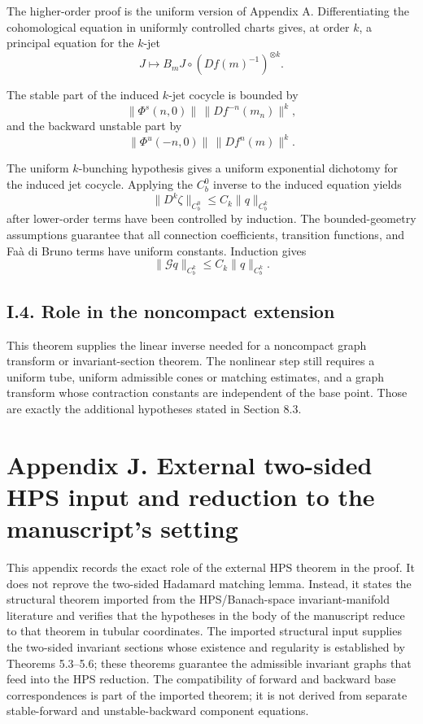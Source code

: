 \documentclass[12pt,a4paper]{article}
\theoremstyle{plain}
\numberwithin{equation}{section}
\numberwithin{theorem}{section}
\begin{document}
The higher-order proof is the uniform version of Appendix A. Differentiating the cohomological equation in uniformly controlled charts gives, at order $k$, a principal equation for the $k$-jet
\[
J\mapsto B_mJ\circ(Df(m)^{-1})^{\otimes k}.
\]

The stable part of the induced $k$-jet cocycle is bounded by
\[
\|\Phi^s(n,0)\|\,\|Df^{-n}(m_n)\|^k,
\]
and the backward unstable part by
\[
\|\Phi^u(-n,0)\|\,\|Df^n(m)\|^k.
\]

The uniform $k$-bunching hypothesis gives a uniform exponential dichotomy for the induced jet cocycle. Applying the $C_b^0$ inverse to the induced equation yields
\[
\|D^k\zeta\|_{C_b^0}
\le C_k\|q\|_{C_b^k}
\]
after lower-order terms have been controlled by induction. The bounded-geometry assumptions guarantee that all connection coefficients, transition functions, and Faà di Bruno terms have uniform constants. Induction gives
\[
\|\mathcal Gq\|_{C_b^k}
\le C_k\|q\|_{C_b^k}.
\]

\subsection{I.4. Role in the noncompact extension}

This theorem supplies the linear inverse needed for a noncompact graph transform or invariant-section theorem. The nonlinear step still requires a uniform tube, uniform admissible cones or matching estimates, and a graph transform whose contraction constants are independent of the base point. Those are exactly the additional hypotheses stated in Section 8.3.

\clearpage

\section{Appendix J. External two-sided HPS input and reduction to the manuscript's setting}

This appendix records the exact role of the external HPS theorem in the proof. It does not reprove the two-sided Hadamard matching lemma. Instead, it states the structural theorem imported from the HPS/Banach-space invariant-manifold literature and verifies that the hypotheses in the body of the manuscript reduce to that theorem in tubular coordinates. The imported structural input supplies the two-sided invariant sections whose existence and regularity is established by Theorems 5.3--5.6; these theorems guarantee the admissible invariant graphs that feed into the HPS reduction. The compatibility of forward and backward base correspondences is part of the imported theorem; it is not derived from separate stable-forward and unstable-backward component equations.
\end{document}

